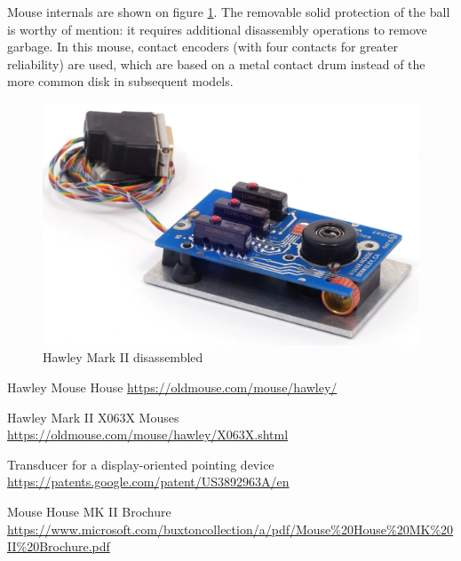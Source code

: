 \documentclass[11pt, a4paper]{article}
\begin{document}
Mouse internals are shown on figure \ref{fig:HawleyMarkIIInside}. The removable solid protection of the ball is worthy of mention: it requires additional disassembly operations to remove garbage. In this mouse, contact encoders (with four contacts for greater reliability) are used, which are based on a metal contact drum instead of the more common disk in subsequent models.

 \begin{figure}[h]
    \centering
    \includegraphics[scale=0.8]{1983_hawley_mark_ii/inside_60.jpg}
    \caption{Hawley Mark II disassembled}
    \label{fig:HawleyMarkIIInside}
\end{figure}

\begin{thebibliography}{9}
 Hawley Mouse House \url{https://oldmouse.com/mouse/hawley/}

 Hawley Mark II X063X Mouses \url{https://oldmouse.com/mouse/hawley/X063X.shtml}

 Transducer for a display-oriented pointing device \url{https://patents.google.com/patent/US3892963A/en}

 Mouse House MK II Brochure \url{https://www.microsoft.com/buxtoncollection/a/pdf/Mouse%20House%20MK%20II%20Brochure.pdf}
\end{thebibliography}
\end{document}
